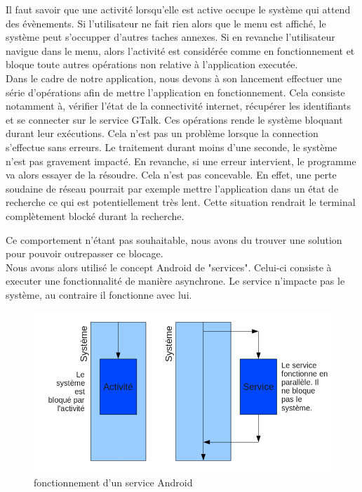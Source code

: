 Il faut savoir que une activité lorsqu'elle est active occupe le système qui attend des évènements.
Si l'utilisateur ne fait rien alors que le menu est affiché, le système peut s'occupper d'autres 
taches annexes. Si en revanche l'utilisateur navigue dans le menu, alors l'activité est considérée
comme en fonctionnement et bloque toute autres opérations non relative à l'application executée.
\\


Dans le cadre de notre application, nous devons à son lancement effectuer une série d'opérations 
afin de mettre l'application en fonctionnement. Cela consiste notamment à, vérifier l'état de la 
connectivité internet, récupérer les identifiants et se connecter sur le service GTalk. Ces 
opérations rende le système bloquant durant leur exécutions. Cela n'est pas un problème lorsque la 
connection s'effectue sans erreurs. Le traitement durant moins d'une seconde, le système n'est pas
gravement impacté. En revanche, si une erreur intervient, le programme va alors essayer de la résoudre.
Cela n'est pas concevable. En effet, une perte soudaine de réseau pourrait par exemple mettre 
l'application dans un état de recherche ce qui est potentiellement très lent. Cette situation rendrait
le terminal complètement blocké durant la recherche. 

Ce comportement n'étant pas souhaitable, nous avons du trouver une solution pour pouvoir outrepasser ce blocage.
\\


Nous avons alors utilisé le concept Android de "services". Celui-ci consiste à executer une fonctionnalité 
de manière asynchrone. Le service n'impacte pas le système, au contraire il fonctionne avec lui. 

\begin{figure}[!h]
	\center
	\includegraphics[width=13cm]{img/fonctionnement-des-services-android.png}
	\caption{fonctionnement d'un service Android}
\end{figure}

